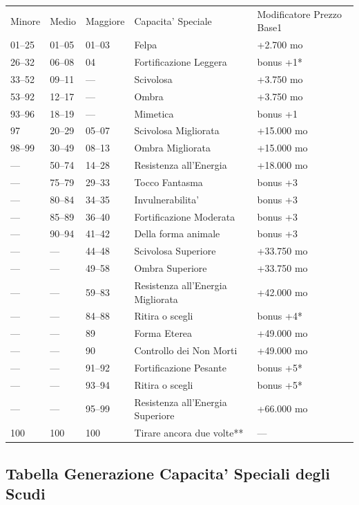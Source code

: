 \documentclass[a4paper,11pt,twoside,openany]{dndbook}
\begin{document}
{\begin{tabular}[c]{@{}lllll@{}}
\toprule 
Minore & Medio & Maggiore & Capacita' Speciale & Modificatore Prezzo Base1\tabularnewline
01--25 & 01--05 & 01--03 & Felpa & +2.700 mo\tabularnewline
26--32 & 06--08 & 04 & Fortificazione Leggera & bonus +1{*}\tabularnewline
33--52 & 09--11 & --- & Scivolosa & +3.750 mo\tabularnewline
53--92 & 12--17 & --- & Ombra & +3.750 mo\tabularnewline
93--96 & 18--19 & --- & Mimetica & bonus +1\tabularnewline
97 & 20--29 & 05--07 & Scivolosa Migliorata & +15.000 mo\tabularnewline
98--99 & 30--49 & 08--13 & Ombra Migliorata & +15.000 mo\tabularnewline
--- & 50--74 & 14--28 & Resistenza all'Energia & +18.000 mo\tabularnewline
--- & 75--79 & 29--33 & Tocco Fantasma & bonus +3\tabularnewline
--- & 80--84 & 34--35 & Invulnerabilita' & bonus +3\tabularnewline
--- & 85--89 & 36--40 & Fortificazione Moderata & bonus +3\tabularnewline
--- & 90--94 & 41--42 & Della forma animale & bonus +3\tabularnewline
--- & --- & 44--48 & Scivolosa Superiore & +33.750 mo\tabularnewline
--- & --- & 49--58 & Ombra Superiore & +33.750 mo\tabularnewline
--- & --- & 59--83 & Resistenza all'Energia Migliorata & +42.000 mo\tabularnewline
--- & --- & 84--88 & Ritira o scegli & bonus +4{*}\tabularnewline
--- & --- & 89 & Forma Eterea & +49.000 mo\tabularnewline
--- & --- & 90 & Controllo dei Non Morti & +49.000 mo\tabularnewline
--- & --- & 91--92 & Fortificazione Pesante & bonus +5{*}\tabularnewline
--- & --- & 93--94 & Ritira o scegli & bonus +5{*}\tabularnewline
--- & --- & 95--99 & Resistenza all'Energia Superiore & +66.000 mo\tabularnewline
100 & 100 & 100 & Tirare ancora due volte{*}{*} & ---\tabularnewline
\bottomrule
\end{tabular}



\subsection{Tabella Generazione Capacita' Speciali degli Scudi}

\label{tabella-generazione-capacita-speciali-degli-scudi}

}
\end{document}
